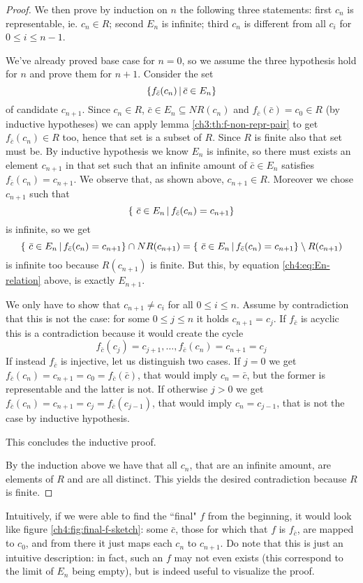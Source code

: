 \begin{proof}
	We then prove by induction on $n$ the following three statements: first $c_n$ is representable, ie. $c_n \in R$; second $E_n$ is infinite; third $c_n$ is different from all $c_i$ for $0 \le i \le n - 1$.
	
	We've already proved base case for $n = 0$, so we assume the three hypothesis hold for $n$ and prove them for $n + 1$.
	Consider the set
	\[
	\{ f_{\bar{c}}(c_n) \,\vert\, \bar{c} \in E_n \}
	\]
	of candidate $c_{n+1}$.
	Since $c_n \in R$, $\bar{c} \in E_n \subseteq NR(c_n)$ and $f_{\bar{c}}(\bar{c}) = c_0 \in R$ (by inductive hypotheses) we can apply lemma \ref{ch3:th:f-non-repr-pair} to get $f_{\bar{c}}(c_n) \in R$ too, hence that set is a subset of $R$. Since $R$ is finite also that set must be.
	By inductive hypothesis we know $E_n$ is infinite, so there must exists an element $c_{n+1}$ in that set such that an infinite amount of $\bar{c} \in E_n$ satisfies $f_{\bar{c}}(c_n) = c_{n+1}$. We observe that, as shown above, $c_{n+1} \in R$. Moreover we chose $c_{n+1}$ such that
	\[
	\{\ \bar{c} \in E_n \,\vert\, f_{\bar{c}}(c_n) = c_{n+1} \}
	\]
	is infinite, so we get
	\[
	\{\ \bar{c} \in E_n \,\vert\, f_{\bar{c}}(c_n) = c_{n+1} \} \cap NR(c_{n+1}) = \{\ \bar{c} \in E_n \,\vert\, f_{\bar{c}}(c_n) = c_{n+1} \} \setminus R(c_{n+1})
	\]
	is infinite too because $R(c_{n+1})$ is finite. But this, by equation \eqref{ch4:eq:En-relation} above, is exactly $E_{n+1}$.
	
	We only have to show that $c_{n+1} \neq c_i$ for all $0 \le i \le n$. Assume by contradiction that this is not the case: for some $0 \le j \le n$ it holds $c_{n+1} = c_j$.
	If $f_{\bar{c}}$ is acyclic this is a contradiction because it would create the cycle
	\[
	f_{\bar{c}}(c_j) = c_{j+1}, \dots, f_{\bar{c}}(c_n) = c_{n+1} = c_j
	\]
	If instead $f_{\bar{c}}$ is injective, let us distinguish two cases. If $j = 0$ we get $f_{\bar{c}}(c_n) = c_{n+1} = c_0 = f_{\bar{c}}(\bar{c})$, that would imply $c_n = \bar{c}$, but the former is representable and the latter is not. If otherwise $j > 0$ we get $f_{\bar{c}}(c_n) = c_{n+1} = c_j = f_{\bar{c}}(c_{j-1})$, that would imply $c_n = c_{j-1}$, that is not the case by inductive hypothesis.

	This concludes the inductive proof.
	
	By the induction above we have that all $c_n$, that are an infinite amount, are elements of $R$ and are all distinct. This yields the desired contradiction because $R$ is finite.
\end{proof}

Intuitively, if we were able to find the ``final" $f$ from the beginning, it would look like figure \ref{ch4:fig:final-f-sketch}: some $\bar{c}$, those for which that $f$ is $f_{\bar{c}}$, are mapped to $c_0$, and from there it just maps each $c_n$ to $c_{n+1}$. Do note that this is just an intuitive description: in fact, such an $f$ may not even exists (this correspond to the limit of $E_n$ being empty), but is indeed useful to visualize the proof.

